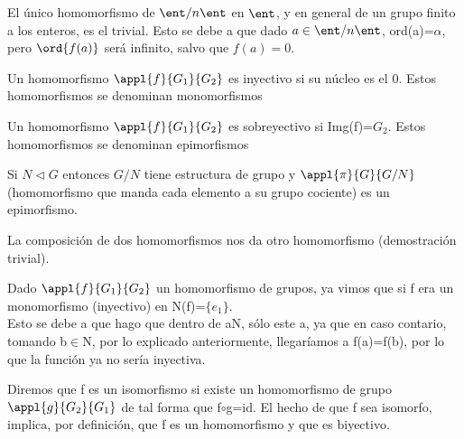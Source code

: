 \documentclass[a4paper,10pt]{apuntes}
\begin{document}
\begin{remark}El único homomorfismo de $\ent/n\ent$  en $\ent$, y en general de un grupo finito a los enteros, es el trivial. Esto se debe
a que dado $a\in\ent/n\ent$, ord(a)=$\alpha$, pero $\ord{f(a)}$ será infinito, salvo que $f(a)=0$.\end{remark}

\begin{defn}
 Un homomorfismo $\appl{f}{G_1}{G_2}$  es inyectivo si su núcleo es el 0. Estos homomorfismos se denominan monomorfismos
\end{defn}

\begin{defn}
 Un homomorfismo $\appl{f}{G_1}{G_2}$  es sobreyectivo si Img(f)=$G_2$. Estos homomorfismos se denominan epimorfismos
\end{defn}
  
\begin{lemma} Si $N\lhd G$ entonces $G/N$ tiene estructura de grupo y $\appl{\pi}{G}{G/N}$  (homomorfismo que manda cada
elemento a su grupo cociente)  es un epimorfismo.
\end{lemma}

La composición de dos homomorfismos nos da otro homomorfismo (demostración trivial).
\begin{corol}
 Dado $\appl{f}{G_1}{G_2}$  un homomorfismo de grupos, ya vimos que si f era un monomorfismo (inyectivo) en N(f)=$\{e_1\}$. \\
 Esto se debe
 a que hago que dentro de aN, sólo este a, ya que en caso contario, tomando b$\in$N, por lo explicado anteriormente, llegaríamos
 a f(a)=f(b), por lo que la función ya no sería inyectiva.
\end{corol}

\begin{defn}[Isomorfismo]
Diremos que f es un isomorfismo si existe un homomorfismo de grupo $\appl{g}{G_2}{G_1}$  de tal forma que f$\circ$g=id. El hecho de
que f sea isomorfo, implica, por definición, que f es un homomorfismo y que es biyectivo.
\end{defn}
\end{document}

